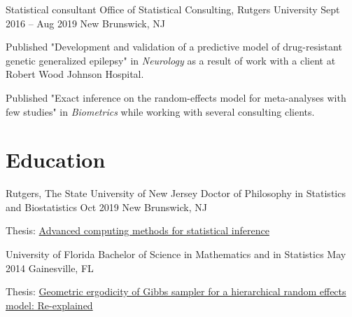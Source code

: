 \documentclass[letterpaper]{resume_config}
\begin{document}
\WorkExperience
    {Statistical consultant} %
    {Office of Statistical Consulting, Rutgers University} %
    {Sept 2016 -- Aug 2019} %
    {New Brunswick, NJ} %
    {
        \item Published "Development and validation of a predictive model of drug-resistant genetic generalized epilepsy" in {\it Neurology} as a result of work with a client at Robert Wood Johnson Hospital. 
        \item Published "Exact inference on the random-effects model for meta-analyses with few studies" in {\it Biometrics} while working with several consulting clients. 
    } 


\section{Education}

\EducationExperience
    {Rutgers, The State University of New Jersey} %
    {Doctor of Philosophy in Statistics and Biostatistics} %
    {Oct 2019} %
    {New Brunswick, NJ} %
    {\item Thesis: \href{    https://rucore.libraries.rutgers.edu/rutgers-lib/61966/}{Advanced computing methods for statistical inference} 
    }

\EducationExperience
    {University of Florida} %
    {Bachelor of Science in Mathematics and in Statistics} %
    {May 2014} %
    {Gainesville, FL} %
    {\item Thesis: \href{https://ufdc.ufl.edu/AA00057032/00001}{Geometric ergodicity of Gibbs sampler for a hierarchical random effects model: Re-explained}}

\end{document}
